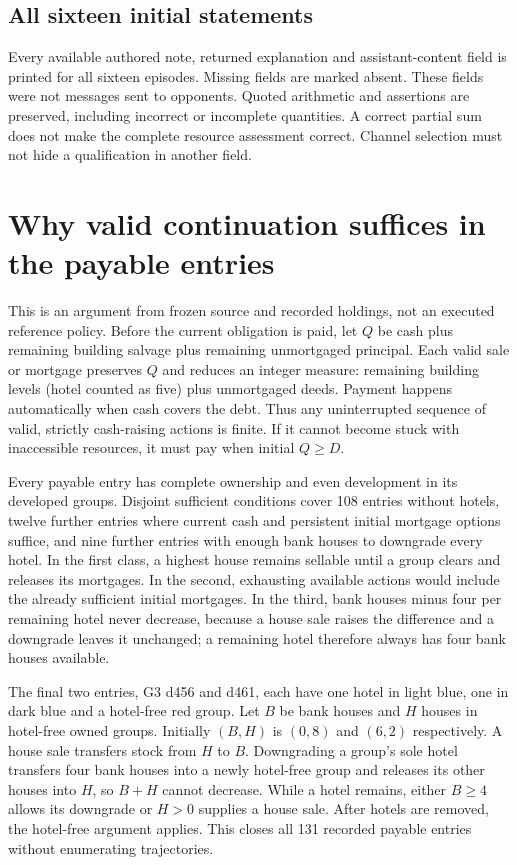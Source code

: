 \subsection{All sixteen initial statements}
\label{app:initial-texts}
Every available authored note, returned explanation and assistant-content field is printed for all sixteen episodes. Missing fields are marked absent. These fields were not messages sent to opponents. Quoted arithmetic and assertions are preserved, including incorrect or incomplete quantities. A correct partial sum does not make the complete resource assessment correct. Channel selection must not hide a qualification in another field.


\section{Why valid continuation suffices in the payable entries}
\label{app:continuation}
This is an argument from frozen source and recorded holdings, not an executed reference policy. Before the current obligation is paid, let $Q$ be cash plus remaining building salvage plus remaining unmortgaged principal. Each valid sale or mortgage preserves $Q$ and reduces an integer measure: remaining building levels (hotel counted as five) plus unmortgaged deeds. Payment happens automatically when cash covers the debt. Thus any uninterrupted sequence of valid, strictly cash-raising actions is finite. If it cannot become stuck with inaccessible resources, it must pay when initial $Q\geq D$.

Every payable entry has complete ownership and even development in its developed groups. Disjoint sufficient conditions cover 108 entries without hotels, twelve further entries where current cash and persistent initial mortgage options suffice, and nine further entries with enough bank houses to downgrade every hotel. In the first class, a highest house remains sellable until a group clears and releases its mortgages. In the second, exhausting available actions would include the already sufficient initial mortgages. In the third, bank houses minus four per remaining hotel never decrease, because a house sale raises the difference and a downgrade leaves it unchanged; a remaining hotel therefore always has four bank houses available.

The final two entries, G3 d456 and d461, each have one hotel in light blue, one in dark blue and a hotel-free red group. Let $B$ be bank houses and $H$ houses in hotel-free owned groups. Initially $(B,H)$ is $(0,8)$ and $(6,2)$ respectively. A house sale transfers stock from $H$ to $B$. Downgrading a group's sole hotel transfers four bank houses into a newly hotel-free group and releases its other houses into $H$, so $B+H$ cannot decrease. While a hotel remains, either $B\geq4$ allows its downgrade or $H>0$ supplies a house sale. After hotels are removed, the hotel-free argument applies. This closes all 131 recorded payable entries without enumerating trajectories.

